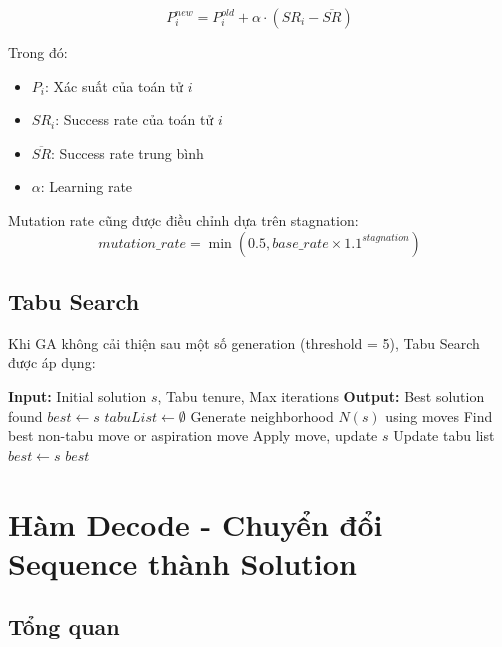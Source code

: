 \documentclass[12pt,a4paper]{article}
\begin{document}
\begin{equation}
    P_i^{new} = P_i^{old} + \alpha \cdot (SR_i - \overline{SR})
\end{equation}

Trong đó:
\begin{itemize}
    \item $P_i$: Xác suất của toán tử $i$
    \item $SR_i$: Success rate của toán tử $i$
    \item $\overline{SR}$: Success rate trung bình
    \item $\alpha$: Learning rate
\end{itemize}

Mutation rate cũng được điều chỉnh dựa trên stagnation:
\begin{equation}
    mutation\_rate = \min(0.5, base\_rate \times 1.1^{stagnation})
\end{equation}

\subsection{Tabu Search}

Khi GA không cải thiện sau một số generation (threshold = 5), Tabu Search được áp dụng:

\begin{algorithm}[H]
\caption{Tabu Search}
\begin{algorithmic}[1]
\STATE \textbf{Input:} Initial solution $s$, Tabu tenure, Max iterations
\STATE \textbf{Output:} Best solution found
\STATE
\STATE $best \leftarrow s$
\STATE $tabuList \leftarrow \emptyset$
\STATE
{}
    \STATE Generate neighborhood $N(s)$ using moves
    \STATE Find best non-tabu move or aspiration move
    \STATE Apply move, update $s$
    \STATE Update tabu list
        \STATE $best \leftarrow s$
    \ENDIF
\ENDFOR
\STATE
\RETURN $best$
\end{algorithmic}
\end{algorithm}

\section{Hàm Decode - Chuyển đổi Sequence thành Solution}

\subsection{Tổng quan}
\end{document}

